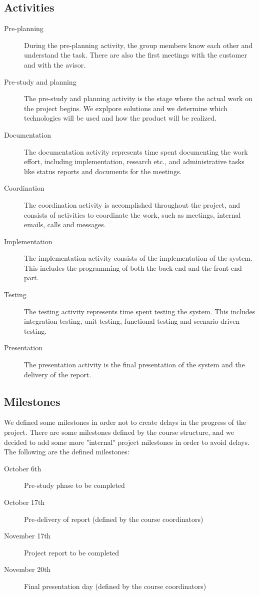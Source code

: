 \documentclass[11pt,a4paper,titlepage,oneside]{report}
\begin{document}
\subsection{Activities}
\begin{description}
\item[Pre-planning] During the pre-planning activity, the group members know each other and understand the task. There are also the first meetings with the customer and with the avisor.
\item[Pre-study and planning] The pre-study and planning activity is the stage where the actual work on the project begins. We explpore solutions and we determine which technologies will be used and how the product will be realized.
\item[Documentation] The documentation activity represents time spent documenting the work effort, including implementation, research etc., and administrative tasks like status reports and documents for the meetings.
\item[Coordination] The coordination activity is accomplished throughout the project, and consists of activities to coordinate the work, such as meetings, internal emails, calls and messages.
\item[Implementation] The implementation activity consists of the implementation of the system. This includes the programming of both the back end and the front end part.
\item[Testing] The testing activity represents time spent testing the system. This includes integration testing, unit testing, functional testing and scenario-driven testing.
\item[Presentation] The presentation activity is the final presentation of the system and the delivery of the report.
\end{description}

\subsection{Milestones}
We defined some milestones in order not to create delays in the progress of the project.
There are some milestones defined by the course structure, and we decided to add some more "internal" project milestones in order to avoid delays.
The following are the defined milestones:
\begin{description}
\item[October 6th] Pre-study phase to be completed
\item[October 17th] Pre-delivery of report (defined by the course coordinators)
\item[November 17th] Project report to be completed
\item[November 20th] Final presentation day (defined by the course coordinators)
\end{description}
\end{document}
